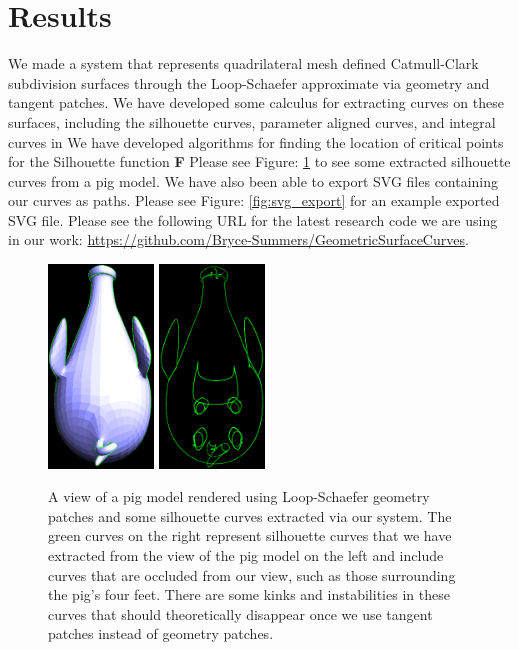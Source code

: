 \documentclass[12pt, letterpaper]{article}
\begin{document}
\section{Results}

We made a system that represents quadrilateral mesh defined Catmull-Clark subdivision surfaces through the Loop-Schaefer approximate via geometry and tangent patches.
We have developed some calculus for extracting curves on these surfaces, including the silhouette curves, parameter aligned curves, and integral curves in
We have developed algorithms for finding the location of critical points for the Silhouette function \textbf{F}
Please see Figure: \ref{fig:pig_silhouettes} to see some extracted silhouette curves from a pig model.
We have also been able to export SVG files containing our curves as paths. Please see Figure: \ref{fig:svg_export} for an example exported SVG file.
Please see the following URL for the latest research code we are using in our work: \url{https://github.com/Bryce-Summers/GeometricSurfaceCurves}.

\begin{figure}[h]
\centering
\includegraphics[width=0.25\textwidth]{Pig_patched}
\includegraphics[width=0.25\textwidth]{Pig_silhouettes}
\caption{A view of a pig model rendered using Loop-Schaefer geometry patches and some silhouette curves extracted via our system.
	The green curves on the right represent silhouette curves that we have extracted from the view of the pig model on the left and include curves that are
	occluded from our view, such as those surrounding the pig's four feet. There are some kinks and instabilities in these curves that should theoretically
	disappear once we use tangent patches instead of geometry patches.}
\label{fig:pig_silhouettes}
\end{figure}
\end{document}
